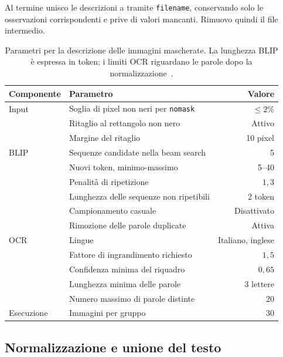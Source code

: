 Al termine unisco le descrizioni a  tramite \texttt{filename}, conservando solo le osservazioni corrispondenti e prive di valori mancanti. Rimuovo quindi il file intermedio.

\begin{table}[htbp]
    \centering
    \small
    \caption{Parametri per la descrizione delle immagini mascherate. La lunghezza BLIP è espressa in token; i limiti OCR riguardano le parole dopo la normalizzazione~\cite{pmlr-v162-li22n, easyocr_software}.}
    \label{tab:descrizioni-parametri}
    \begin{tabular}{@{}llr@{}}
        \toprule
        Componente & Parametro & Valore \\
        \midrule
        Input & Soglia di pixel non neri per \texttt{nomask} & $\leq 2\%$ \\
              & Ritaglio al rettangolo non nero & Attivo \\
              & Margine del ritaglio & 10 pixel \\
        \addlinespace
        BLIP & Sequenze candidate nella beam search & 5 \\
             & Nuovi token, minimo-massimo & 5--40 \\
             & Penalità di ripetizione & $1{,}3$ \\
             & Lunghezza delle sequenze non ripetibili & 2 token \\
             & Campionamento casuale & Disattivato \\
             & Rimozione delle parole duplicate & Attiva \\
        \addlinespace
        OCR & Lingue & Italiano, inglese \\
            & Fattore di ingrandimento richiesto & $1{,}5$ \\
            & Confidenza minima del riquadro & $0{,}65$ \\
            & Lunghezza minima delle parole & 3 lettere \\
            & Numero massimo di parole distinte & 20 \\
        \addlinespace
        Esecuzione & Immagini per gruppo & 30 \\
        \bottomrule
    \end{tabular}
\end{table}

\subsection{Normalizzazione e unione del testo}
\label{subsec:metodi-descrizioni-output}

